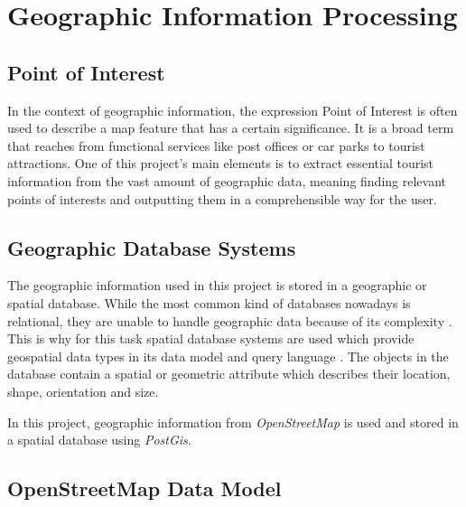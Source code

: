 \section{Geographic Information Processing}

\subsection{Point of Interest}
In the context of geographic information, the expression Point of Interest \cite{osm:poi}  is often used to describe a map feature that has a certain significance. It is a broad term that reaches from functional services like post offices or car parks to tourist attractions. One of this project’s main elements is to extract essential tourist information from the vast amount of geographic data, meaning finding relevant points of interests and outputting them in a comprehensible way for the user.  

\subsection{Geographic Database Systems}
The geographic information used in this project is stored in a geographic or spatial database. While the most common kind of databases nowadays is relational, they are unable to handle geographic data because of its complexity \cite{rigaux02}. This is why for this task spatial database systems are used which provide geospatial data types in its data model and query language \cite{gueting94}. The objects in the database contain a spatial or geometric attribute which describes their location, shape, orientation and size.

In this project, geographic information from \textit{OpenStreetMap} is used and stored in a spatial database using \textit{PostGis}.

\subsection{OpenStreetMap Data Model}

